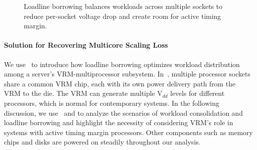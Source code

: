 \begin{figure}[!b]
\centering
\vspace*{-10pt}
\hfill
{}
\caption{Loadline borrowing balances workloads across multiple sockets to reduce per-socket voltage drop and create room for active timing margin.}
\label{fig:ll-borrow-idea}
\end{figure}

\paragraph{Solution for Recovering Multicore Scaling Loss}

We use~ to introduce how loadline borrowing optimizes workload distribution among a server's VRM-multiprocessor subsystem. In~, multiple processor sockets share a common VRM chip, each with its own power delivery path from the VRM to the die. The VRM can generate multiple V$_{dd}$ levels for different processors, which is normal for contemporary systems. In the following discussion, we use~ and  to analyze the scenarios of workload consolidation and loadline borrowing and highlight the necessity of considering VRM's role in systems with active timing margin processors. Other components such as memory chips and disks are powered on steadily throughout our analysis.

